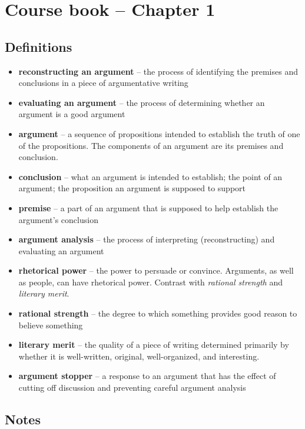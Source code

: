 \section{Course book -- Chapter 1}

\subsection{Definitions}
\begin{itemize}
	\item \textbf{reconstructing an argument} -- the process of identifying
	the premises and conclusions in a piece of argumentative writing
	\item \textbf{evaluating an argument} -- the process of determining
	whether an argument is a good argument
	\item \textbf{argument} -- a sequence of propositions intended to
	establish the truth of one of the propositions. The components of an
	argument are its premises and conclusion.
	\item \textbf{conclusion} -- what an argument is intended to establish;
	the point of an argument; the proposition an argument is supposed to
	support
	\item \textbf{premise} -- a part of an argument that is supposed to
	help establish the argument's conclusion
	\item \textbf{argument analysis} -- the process of interpreting
	(reconstructing) and evaluating an argument
	\item \textbf{rhetorical power} -- the power to persuade or convince.
	Arguments, as well as people, can have rhetorical power. Contrast with
	\textit{rational strength} and \textit{literary merit}.
	\item \textbf{rational strength} -- the degree to which something
	provides good reason to believe something
	\item \textbf{literary merit} -- the quality of a piece of writing
	determined primarily by whether it is well-written, original,
	well-organized, and interesting.
	\item \textbf{argument stopper} -- a response to an argument that has
	the effect of cutting off discussion and preventing careful argument
	analysis
\end{itemize}

\subsection{Notes}

